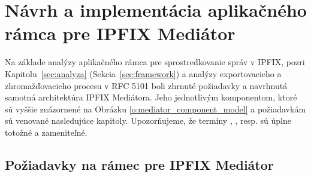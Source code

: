 \section{Návrh a implementácia aplikačného rámca pre IPFIX Mediátor} \label{sec:navrh}

Na základe analýzy aplikačného rámca pre sprostredkovanie správ v IPFIX, pozri Kapitolu~\ref{sec:analyza} 
(Sekcia~\ref{sec:framework}) a analýzy exportovacieho a zhromažďovacieho procesu v RFC 5101
\citep{rfc5101} boli zhrnuté požiadavky a navrhnutá samotná architektúra IPFIX Mediátora. 
Jeho jednotlivým komponentom, ktoré sú vyššie znázornené na Obrázku \ref{o:mediator_component_model} 
a požiadavkám sú venované nasledujúce kapitoly. Upozorňujeme, že termíny , 
, resp.  sú úplne totožné a zameniteľné.


\subsection{Požiadavky na rámec pre IPFIX Mediátor}

